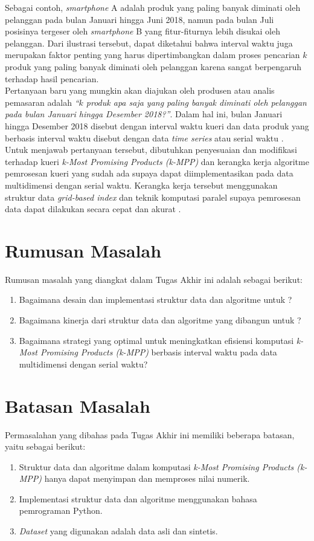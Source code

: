 \tab Sebagai contoh, \textit{smartphone} A adalah produk yang paling banyak diminati oleh pelanggan pada bulan Januari hingga Juni 2018, namun pada bulan Juli posisinya tergeser oleh \textit{smartphone} B yang fitur-fiturnya lebih disukai oleh pelanggan. Dari ilustrasi tersebut, dapat diketahui bahwa interval waktu juga merupakan faktor penting yang harus dipertimbangkan dalam proses pencarian $k$ produk yang paling banyak diminati oleh pelanggan karena sangat berpengaruh terhadap hasil pencarian.\\
\tab Pertanyaan baru yang mungkin akan diajukan oleh produsen atau analis
pemasaran adalah \textit{“$k$ produk apa saja yang paling banyak diminati oleh pelanggan pada bulan Januari hingga Desember 2018?”}. Dalam hal ini, bulan Januari hingga Desember 2018 disebut dengan interval waktu kueri dan data produk yang berbasis interval waktu disebut dengan data \textit{time series} atau serial waktu \cite{interval-skyline}.\\
\tab Untuk menjawab pertanyaan tersebut, dibutuhkan penyesuaian dan modifikasi terhadap kueri \textit{k-Most Promising Products (k-MPP)} dan kerangka kerja algoritme pemrosesan kueri yang sudah ada supaya dapat diimplementasikan pada data multidimensi dengan serial waktu. Kerangka kerja tersebut menggunakan struktur data \textit{grid-based index} dan teknik komputasi paralel supaya pemrosesan data dapat dilakukan secara cepat dan akurat \cite{kmpp}.

\section{Rumusan Masalah}
\tab Rumusan masalah yang diangkat dalam Tugas Akhir ini adalah sebagai berikut:
\begin{enumerate}
	\item Bagaimana desain dan implementasi struktur data dan algoritme untuk \problem?
	\item Bagaimana kinerja dari struktur data dan algoritme yang dibangun untuk \problem?
	\item Bagaimana strategi yang optimal untuk meningkatkan efisiensi komputasi \textit{k-Most Promising Products (k-MPP)} berbasis interval waktu pada data multidimensi dengan serial waktu?
\end{enumerate}

\section{Batasan Masalah}
\tab Permasalahan yang dibahas pada Tugas Akhir ini memiliki beberapa batasan, yaitu sebagai berikut:
\begin{enumerate}
	\item Struktur data dan algoritme dalam komputasi \textit{k-Most Promising Products (k-MPP)} hanya dapat menyimpan dan memproses nilai numerik.
	\item Implementasi struktur data dan algoritme menggunakan bahasa pemrograman Python.
	\item \textit{Dataset} yang digunakan adalah data asli dan sintetis.
\end{enumerate}

